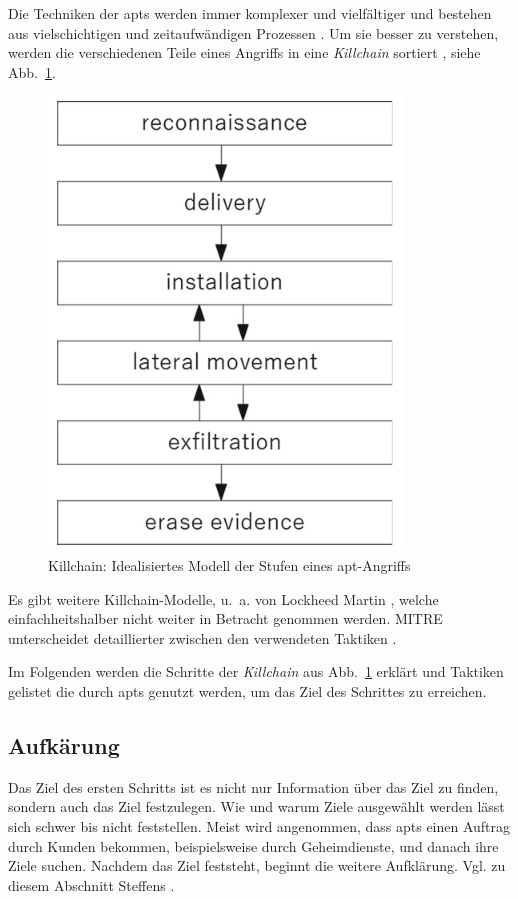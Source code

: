 \documentclass[conference]{IEEEtran}
\begin{document}
Die Techniken der \acp{apt} werden immer komplexer und vielfältiger und bestehen aus vielschichtigen und zeitaufwändigen Prozessen \cite[S.~7f]{Steffens2020}.
Um sie besser zu verstehen, werden die verschiedenen Teile eines Angriffs in eine \textit{Killchain} sortiert \cite[S.~8]{Steffens2020}, siehe Abb.~\ref{fig.killchain}.
\begin{figure}[htbp]
    \centerline{\includegraphics[scale=0.8]{figures/killchain.png}}
    \caption{Killchain: Idealisiertes Modell der Stufen eines \ac{apt}-Angriffs \cite[S.~8]{Steffens2020}}
    \label{fig.killchain}
\end{figure}
Es gibt weitere Killchain-Modelle, u.~a. von Lockheed Martin \cite{LockheedMartin}, welche einfachheitshalber nicht weiter in Betracht genommen werden.
MITRE unterscheidet detaillierter zwischen den verwendeten Taktiken \cite{MITREEnterpriseTactics}.

Im Folgenden werden die Schritte der \textit{Killchain} aus Abb.~\ref{fig.killchain} erklärt und Taktiken gelistet die durch \acp{apt} genutzt werden, um das Ziel des Schrittes zu erreichen.

\subsection{Aufkärung}

Das Ziel des ersten Schritts ist es nicht nur Information über das Ziel zu finden, sondern auch das Ziel festzulegen.
Wie und warum Ziele ausgewählt werden lässt sich schwer bis nicht feststellen.
Meist wird angenommen, dass \acp{apt} einen Auftrag durch Kunden bekommen, beispielsweise durch Geheimdienste, und danach ihre Ziele suchen.
Nachdem das Ziel feststeht, beginnt die weitere Aufklärung.
Vgl. zu diesem Abschnitt Steffens \cite[S.~10ff]{Steffens2020}.
\end{document}
